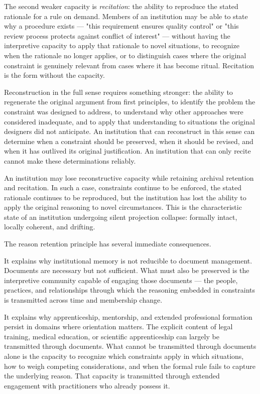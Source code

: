 The second weaker capacity is \emph{recitation}: the ability to reproduce
the stated rationale for a rule on demand. Members of an institution may
be able to state why a procedure exists --- "this requirement ensures quality
control" or "this review process protects against conflict of interest" ---
without having the interpretive capacity to apply that rationale to novel
situations, to recognize when the rationale no longer applies, or to
distinguish cases where the original constraint is genuinely relevant from
cases where it has become ritual. Recitation is the form without the capacity.

Reconstruction in the full sense requires something stronger: the ability
to regenerate the original argument from first principles, to identify the
problem the constraint was designed to address, to understand why other
approaches were considered inadequate, and to apply that understanding to
situations the original designers did not anticipate. An institution that
can reconstruct in this sense can determine when a constraint should be
preserved, when it should be revised, and when it has outlived its original
justification. An institution that can only recite cannot make these
determinations reliably.

\begin{observation}
An institution may lose reconstructive capacity while retaining archival
retention and recitation. In such a case, constraints continue to be
enforced, the stated rationale continues to be reproduced, but the
institution has lost the ability to apply the original reasoning to novel
circumstances. This is the characteristic state of an institution undergoing
silent projection collapse: formally intact, locally coherent, and drifting.
\end{observation}

The reason retention principle has several immediate consequences.

It explains why institutional memory is not reducible to document management.
Documents are necessary but not sufficient. What must also be preserved is
the interpretive community capable of engaging those documents --- the people,
practices, and relationships through which the reasoning embedded in constraints
is transmitted across time and membership change.

It explains why apprenticeship, mentorship, and extended professional formation
persist in domains where orientation matters. The explicit content of legal
training, medical education, or scientific apprenticeship can largely be
transmitted through documents. What cannot be transmitted through documents
alone is the capacity to recognize which constraints apply in which situations,
how to weigh competing considerations, and when the formal rule fails to
capture the underlying reason. That capacity is transmitted through extended
engagement with practitioners who already possess it.

